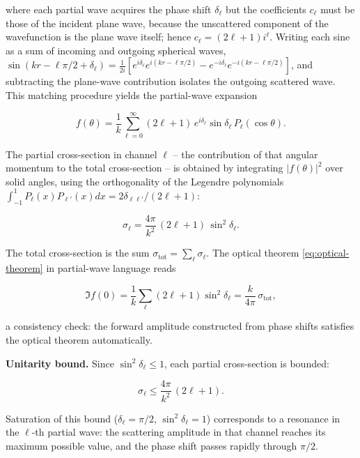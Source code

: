 where each partial wave acquires the phase shift $\delta_{\ell}$ but the coefficients $c_{\ell}$ must be those of the incident plane wave, because the unscattered component of the wavefunction is the plane wave itself; hence $c_{\ell} = (2\ell+1)i^{\ell}$.
Writing each sine as a sum of incoming and outgoing spherical waves,
$\sin(kr - \ell\pi/2 + \delta_{\ell}) = \frac{1}{2i}[e^{i\delta_{\ell}}e^{i(kr-\ell\pi/2)} - e^{-i\delta_{\ell}}e^{-i(kr-\ell\pi/2)}]$,
and subtracting the plane-wave contribution isolates the outgoing scattered wave. This matching procedure yields the partial-wave expansion
\begin{linenomath}
\begin{equation}
f(\theta) = \frac{1}{k}\sum_{\ell=0}^{\infty} (2\ell+1)\,e^{i\delta_{\ell}}\sin\delta_{\ell}\,P_{\ell}(\cos\theta).
\label{eq:partial-wave-expansion}
\end{equation}
\end{linenomath}

The partial cross-section in channel $\ell$ -- the contribution of that angular momentum to the total cross-section -- is obtained by integrating $|f(\theta)|^{2}$ over solid angles, using the orthogonality of the Legendre polynomials $\int_{-1}^{1}P_{\ell}(x)P_{\ell'}(x)dx = 2\delta_{\ell\ell'}/(2\ell+1)$:
\begin{linenomath}
\begin{equation}
\sigma_{\ell} = \frac{4\pi}{k^{2}}\,(2\ell+1)\,\sin^{2}\delta_{\ell}.
\label{eq:partial-cross-section}
\end{equation}
\end{linenomath}
The total cross-section is the sum $\sigma_{\text{tot}} = \sum_{\ell}\sigma_{\ell}$. The optical theorem \eqref{eq:optical-theorem} in partial-wave language reads
\begin{linenomath}
\begin{equation*}
\Im f(0) = \frac{1}{k}\sum_{\ell}(2\ell+1)\sin^{2}\delta_{\ell} = \frac{k}{4\pi}\,\sigma_{\text{tot}},
\end{equation*}
\end{linenomath}
a consistency check: the forward amplitude constructed from phase shifts satisfies the optical theorem automatically.

\medskip\noindent\textbf{Unitarity bound.}
Since $\sin^{2}\delta_{\ell} \le 1$, each partial cross-section is bounded:
\begin{linenomath}
\begin{equation*}
\sigma_{\ell} \le \frac{4\pi}{k^{2}}\,(2\ell+1).
\end{equation*}
\end{linenomath}
Saturation of this bound ($\delta_{\ell} = \pi/2$, $\sin^{2}\delta_{\ell}=1$) corresponds to a resonance in the $\ell$-th partial wave: the scattering amplitude in that channel reaches its maximum possible value, and the phase shift passes rapidly through $\pi/2$.

